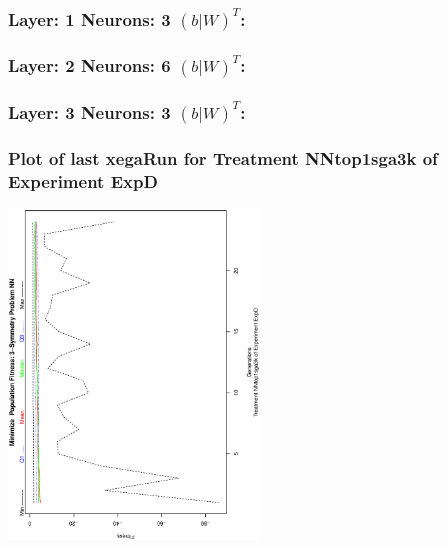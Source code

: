 \documentclass[18pt,c]{beamer}
\begin{document}

 \begin{frame}
 \fontsize{8pt}{9pt}\selectfont
 \frametitle{ Layer: 1 Neurons: 3  $(b|W)^T$: 
 }

 \label{ExpDNNWeightTable003.tex}  
 \end{frame}


 \begin{frame}
 \fontsize{8pt}{9pt}\selectfont
 \frametitle{ Layer: 2 Neurons: 6  $(b|W)^T$: 
 }

 \label{ExpDNNWeightTable004.tex}  
 \end{frame}


 \begin{frame}
 \fontsize{8pt}{9pt}\selectfont
 \frametitle{ Layer: 3 Neurons: 3  $(b|W)^T$: 
 }

 \label{ExpDNNWeightTable005.tex}  
 \end{frame}

 \begin{frame}
 \frametitle{ Plot of last xegaRun for Treatment NNtop1sga3k of Experiment ExpD }
 \begin{center}
\includegraphics[width=0.5\textwidth, angle=-90]
{ExpDPlotPopStatsFigure001.eps}
 \end{center}
 \label{report/ExpDPlotPopStatsFigure001.eps}  
 \end{frame}
\end{document}
